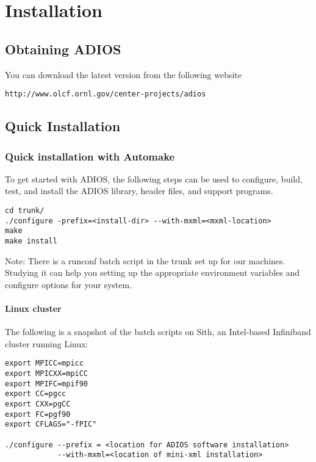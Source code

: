 \chapter{Installation}

\section{Obtaining ADIOS}

You can download the latest version from the following website

\begin{lstlisting}[language={}]
http://www.olcf.ornl.gov/center-projects/adios
\end{lstlisting}


\section{Quick Installation}

\subsection{Quick installation with Automake}

To get started with ADIOS, the following steps can be used to configure, build,
test, and install the ADIOS library, header files, and support programs.

\begin{lstlisting}
cd trunk/
./configure -prefix=<install-dir> --with-mxml=<mxml-location>
make
make install
\end{lstlisting}

Note: There is a runconf batch script in the trunk set up for our machines. Studying
it can help you setting up the appropriate environment variables and configure
options for your system.

\subsubsection{Linux cluster}

The following is a snapshot of the batch scripts on Sith, an Intel-based Infiniband
cluster running Linux:

\begin{lstlisting}
export MPICC=mpicc
export MPICXX=mpiCC
export MPIFC=mpif90
export CC=pgcc
export CXX=pgCC
export FC=pgf90
export CFLAGS="-fPIC"

./configure --prefix = <location for ADIOS software installation>
            --with-mxml=<location of mini-xml installation>
\end{lstlisting}


